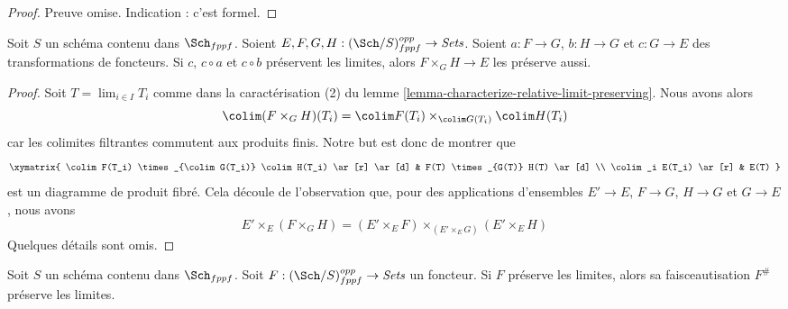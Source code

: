 \begin{proof}
Preuve omise. Indication : c'est formel.
\end{proof}

\begin{lemma}
\label{lemma-fibre-product-locally-finite-presentation}
Soit $S$ un schéma contenu dans $\Sch_{fppf}$.
Soient $E, F, G, H : (\Sch/S)_{fppf}^{opp} \to \textit{Sets}$.
Soient $a : F \to G$, $b : H \to G$ et $c : G \to E$
des transformations de foncteurs. Si $c$, $c \circ a$ et $c \circ b$
préservent les limites, alors $F \times_G H \to E$ les préserve aussi.
\end{lemma}

\begin{proof}
Soit $T = \lim_{i \in I} T_i$ comme dans la caractérisation (2) du
lemme \ref{lemma-characterize-relative-limit-preserving}.
Nous avons alors
$$
\colim (F \times_G H)(T_i) =
\colim F(T_i) \times_{\colim G(T_i)} \colim H(T_i)
$$
car les colimites filtrantes commutent aux produits finis. Notre but est donc de
montrer que
$$
\xymatrix{
\colim F(T_i) \times_{\colim G(T_i)} \colim H(T_i) \ar[r] \ar[d] &
F(T) \times_{G(T)} H(T) \ar[d] \\
\colim_i E(T_i) \ar[r] & E(T)
}
$$
est un diagramme de produit fibré. Cela découle de l'observation que,
pour des applications d'ensembles $E' \to E$, $F \to G$, $H \to G$ et $G \to E$,
nous avons
$$
E' \times_E (F \times_G H) =
(E' \times_E F) \times_{(E' \times_E G)} (E' \times_E H)
$$
Quelques détails sont omis.
\end{proof}

\begin{lemma}
\label{lemma-sheafify-finite-presentation}
Soit $S$ un schéma contenu dans $\Sch_{fppf}$.
Soit $F : (\Sch/S)_{fppf}^{opp} \to \textit{Sets}$ un foncteur.
Si $F$ préserve les limites, alors sa faisceautisation $F^\#$ préserve les limites.
\end{lemma}

